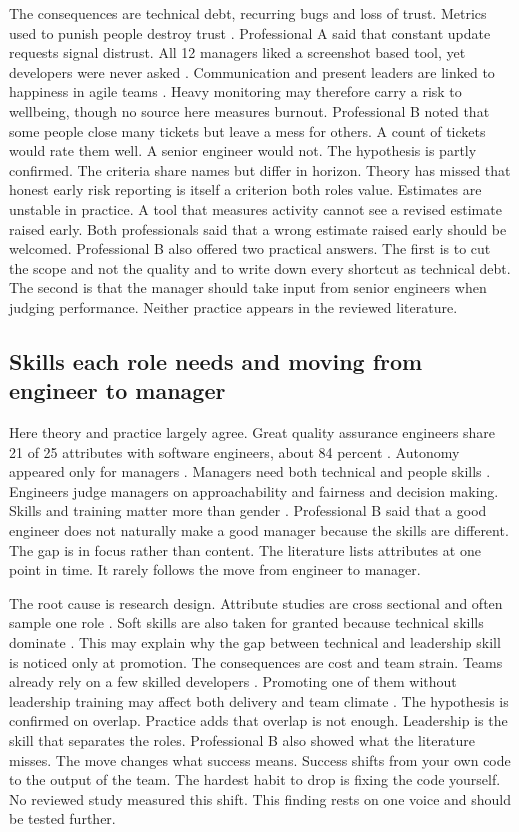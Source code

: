 \documentclass[conference]{IEEEtran}
\begin{document}
The consequences are technical debt, recurring bugs and loss of trust. Metrics used to punish people destroy trust \cite{kurt2024}. Professional A said that constant update requests signal distrust. All 12 managers liked a screenshot based tool, yet developers were never asked \cite{suwarno2025}. Communication and present leaders are linked to happiness in agile teams \cite{amorim2020}. Heavy monitoring may therefore carry a risk to wellbeing, though no source here measures burnout. Professional B noted that some people close many tickets but leave a mess for others. A count of tickets would rate them well. A senior engineer would not. The hypothesis is partly confirmed. The criteria share names but differ in horizon. Theory has missed that honest early risk reporting is itself a criterion both roles value. Estimates are unstable in practice. A tool that measures activity cannot see a revised estimate raised early. Both professionals said that a wrong estimate raised early should be welcomed. Professional B also offered two practical answers. The first is to cut the scope and not the quality and to write down every shortcut as technical debt. The second is that the manager should take input from senior engineers when judging performance. Neither practice appears in the reviewed literature.

\subsection{Skills each role needs and moving from engineer to manager}

Here theory and practice largely agree. Great quality assurance engineers share 21 of 25 attributes with software engineers, about 84 percent \cite{farias2025}. Autonomy appeared only for managers \cite{farias2025}. Managers need both technical and people skills \cite{kalluri2025}. Engineers judge managers on approachability and fairness and decision making. Skills and training matter more than gender \cite{qureshi2013}. Professional B said that a good engineer does not naturally make a good manager because the skills are different. The gap is in focus rather than content. The literature lists attributes at one point in time. It rarely follows the move from engineer to manager.

The root cause is research design. Attribute studies are cross sectional and often sample one role \cite{zoric2018,farias2025}. Soft skills are also taken for granted because technical skills dominate \cite{zoric2018}. This may explain why the gap between technical and leadership skill is noticed only at promotion. The consequences are cost and team strain. Teams already rely on a few skilled developers \cite{afshari2018}. Promoting one of them without leadership training may affect both delivery and team climate \cite{amorim2020}. The hypothesis is confirmed on overlap. Practice adds that overlap is not enough. Leadership is the skill that separates the roles. Professional B also showed what the literature misses. The move changes what success means. Success shifts from your own code to the output of the team. The hardest habit to drop is fixing the code yourself. No reviewed study measured this shift. This finding rests on one voice and should be tested further.
\end{document}
